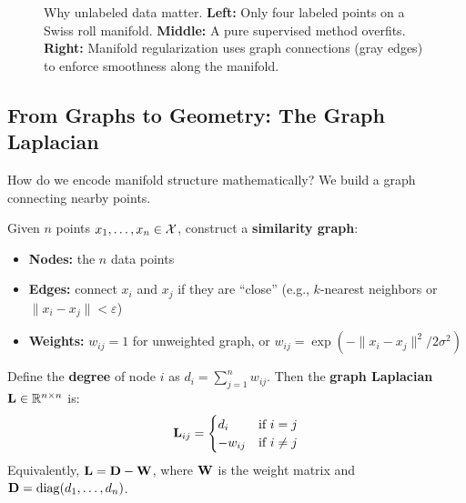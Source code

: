 \begin{notechapter}
\begin{figure}[ht]
\caption{Why unlabeled data matter. \textbf{Left:} Only four labeled 
points on a Swiss roll manifold. \textbf{Middle:} A pure supervised 
method overfits. \textbf{Right:} Manifold regularization uses graph 
connections (gray edges) to enforce smoothness along the manifold.}
\label{rkhs:fig:manifold_motivation}
\end{figure}

\subsection{From Graphs to Geometry: The Graph Laplacian}
\label{rkhs:subsec:graph_laplacian}

How do we encode manifold structure mathematically? We build a graph
connecting nearby points.

\begin{definitionbox}
\begin{definition}
\label{rkhs:def:graph_laplacian}
Given $n$ points $x_1,\ldots,x_n \in \mathcal{X}$, construct a 
\textbf{similarity graph}:
\begin{itemize}
  \item \textbf{Nodes:} the $n$ data points
  \item \textbf{Edges:} connect $x_i$ and $x_j$ if they are ``close'' 
    (e.g., $k$-nearest neighbors or $\|x_i - x_j\| < \varepsilon$)
  \item \textbf{Weights:} $w_{ij} = 1$ for unweighted graph, or 
    $w_{ij} = \exp(-\|x_i - x_j\|^2/2\sigma^2)$
\end{itemize}
Define the \textbf{degree} of node $i$ as $d_i = \sum_{j=1}^n w_{ij}$.
Then the \textbf{graph Laplacian} $\mathbf{L} \in \mathbb{R}^{n \times n}$ is:
\[
\mathbf{L}_{ij} = 
\begin{cases}
d_i & \text{if } i = j \\
-w_{ij} & \text{if } i \neq j
\end{cases}
\]
Equivalently, $\mathbf{L} = \mathbf{D} - \mathbf{W}$, where $\mathbf{W}$ is the 
weight matrix and $\mathbf{D} = \operatorname{diag}(d_1,\ldots,d_n)$.
\end{definition}
\end{definitionbox}


\end{notechapter}
